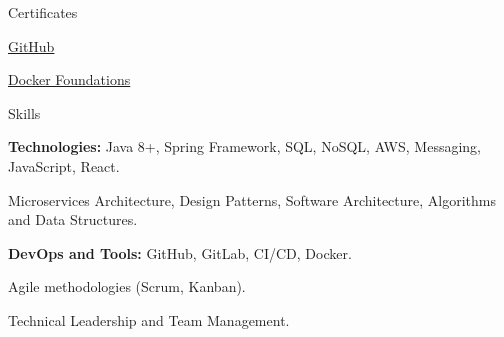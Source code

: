 \documentclass{domingosfelipe-resume}
\begin{document}
    \begin{rSection}{Certificates}
        \begin{rSkillsSubsection}
            \item \href{https://www.linkedin.com/learning/certificates/3781e6e11a2fe389fcb48387012853f893c2bdbc3decd7c57790c2c850c316be?trk=share_certificate}{GitHub}
            \item \href{https://www.linkedin.com/learning/certificates/bd30b94ff1b980132e44f68668e4a1c56b9fddb10832c9c01d9d65ce7d2b9c62?trk=share_certificate}{Docker Foundations}
        \end{rSkillsSubsection}
    \end{rSection}

    \begin{rSection}{Skills}
        \item \textbf{Technologies:} Java 8+, Spring Framework, SQL, NoSQL, AWS, Messaging, JavaScript, React.
        \item Microservices Architecture, Design Patterns, Software Architecture, Algorithms and Data Structures.
        \item \textbf{DevOps and Tools:} GitHub, GitLab, CI/CD, Docker.
        \item Agile methodologies (Scrum, Kanban).
        \item Technical Leadership and Team Management.
    \end{rSection}
\end{document}

